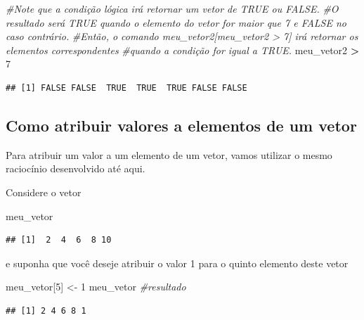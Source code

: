 \documentclass[
]{book}
\newenvironment{Shaded}{\begin{snugshade}}{\end{snugshade}}
\newcommand{\CommentTok}[1]{\textcolor[rgb]{0.56,0.35,0.01}{\textit{#1}}}
\newcommand{\DecValTok}[1]{\textcolor[rgb]{0.00,0.00,0.81}{#1}}
\newcommand{\NormalTok}[1]{#1}
\newcommand{\OperatorTok}[1]{\textcolor[rgb]{0.81,0.36,0.00}{\textbf{#1}}}
\newcommand{\StringTok}[1]{\textcolor[rgb]{0.31,0.60,0.02}{#1}}
\begin{document}
\begin{Shaded}
\begin{Highlighting}[]
\CommentTok{#Note que a condição lógica irá retornar um vetor de TRUE ou FALSE.}
\CommentTok{#O resultado será TRUE quando o elemento do vetor for maior que 7 e FALSE no caso contrário.}
\CommentTok{#Então, o comando meu_vetor2[meu_vetor2 > 7] irá retornar os elementos correspondentes}
\CommentTok{#quando a condição for igual a TRUE.}
\NormalTok{meu_vetor2 }\OperatorTok{>}\StringTok{ }\DecValTok{7} 
\end{Highlighting}
\end{Shaded}

\begin{verbatim}
## [1] FALSE FALSE  TRUE  TRUE  TRUE FALSE FALSE
\end{verbatim}

\hypertarget{como-atribuir-valores-a-elementos-de-um-vetor}{%
\subsection{Como atribuir valores a elementos de um
vetor}\label{como-atribuir-valores-a-elementos-de-um-vetor}}

Para atribuir um valor a um elemento de um vetor, vamos utilizar o mesmo
raciocínio desenvolvido até aqui.

Considere o vetor

\begin{Shaded}
\begin{Highlighting}[]
\NormalTok{meu_vetor}
\end{Highlighting}
\end{Shaded}

\begin{verbatim}
## [1]  2  4  6  8 10
\end{verbatim}

e suponha que você deseje atribuir o valor 1 para o quinto elemento
deste vetor

\begin{Shaded}
\begin{Highlighting}[]
\NormalTok{meu_vetor[}\DecValTok{5}\NormalTok{] <-}\StringTok{ }\DecValTok{1}
\NormalTok{meu_vetor }\CommentTok{#resultado}
\end{Highlighting}
\end{Shaded}

\begin{verbatim}
## [1] 2 4 6 8 1
\end{verbatim}
\end{document}
